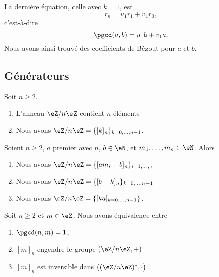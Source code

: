 La dernière équation, celle avec \( k=1\), est
\begin{equation}
    r_n=u_1r_1+v_1r_0,
\end{equation}
c'est-à-dire
\begin{equation}        \label{EqNDMLooDvaiAc}
    \pgcd(a,b)=u_1b+v_1a.
\end{equation}
Nous avons ainsi trouvé des coefficients de Bézout pour $a$ et $b$.

\subsection{Générateurs}

\begin{proposition}   \label{PROPooEWREooUOSMsE}
    Soit \( n\geq 2\). 
    \begin{enumerate}
        \item
            L'anneau \( \eZ/n\eZ\) contient \( n\) éléments
        \item
            Nous avons \( \eZ/n\eZ=\{ [k]_n \}_{k=0,\ldots, n-1}\).
    \end{enumerate}
\end{proposition}

\begin{proposition}       \label{PROPooSKSYooZoDhIP}
    Soient \( n\geq 2\), $a$ premier avec \( n\), \( b\in \eN\), et \( m_1,\ldots, m_n\in \eN\). Alors
    \begin{enumerate}
        \item
            Nous avons $\eZ/n\eZ=\{ [am_i+b]_n \}_{i=1,\ldots, }$,
        \item
            Nous avons \( \eZ/n\eZ=\{ [b+k]_n \}_{k=0,\ldots, n-1}\)
        \item
            Nous avons \( \eZ/n\eZ=\{ [ka]_{k=0,\ldots, n-1} \}\).
    \end{enumerate}
\end{proposition}

\begin{proposition}       \label{PROPooMTWGooEMbvDi}
    Soit \( n\geq 2\) et \( m\in \eZ\). Nous avons équivalence entre
    \begin{enumerate}
        \item
            \( \pgcd(n,m)=1\),
        \item
            \( [m]_n\) engendre le groupe \( (\eZ/n\eZ,+)\)
        \item
            \( [m]_n\) est inversible dans \( \big( (\eZ/n\eZ)^*,\cdot \big)\).
    \end{enumerate}
\end{proposition}

